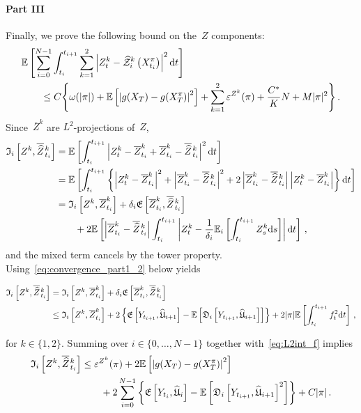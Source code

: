 \paragraph{\textbf{Part III}} 
Finally, we prove the following bound on the~$Z$ components:
\begin{align}\label{eq:convergence_part3_result}
\begin{split}
 &\mathbb{E}\left[\sum_{i=0}^{N-1} \int_{t_i}^{t_{i+1}}\sum_{k=1}^2\left|Z_t^k-\widehat{\mathcal{Z}}^k_i\left(X^\pi_{t_i}\right)\right|^2 \mathrm{d} t\right] \\
 &\qquad\leq C\Bigg\{\omega(|\pi|) + \mathbb{E}\left[\left|g(X_T)-g(X^\pi_T)\right|^2\right]+\sum_{k=1}^2\varepsilon^{Z^k}(\pi)+\frac{C^{*}}{K}N + M|\pi|^2\Bigg\}\,.
 \end{split}
\end{align}
Since~$\overline{Z}^k$ are $L^2$-projections of~$Z$,
\begin{align*}
\mathfrak{I}_i\left[Z^k, \overline{\widehat{Z}}\kern0.1em^{k}_{t_i}\right] 
&= \mathbb{E}\left[\int_{t_i}^{t_{i+1}}\left|Z^k_t - \overline{Z}^{k}_{t_{i}} + \overline{Z}^{k}_{t_{i}} - \overline{\widehat{Z}}\kern0.1em^{k}_{t_{i}}\right|^2\mathrm{d} t\right] \\
 &= \mathbb{E}\left[ \int_{t_i}^{t_{i+1}}\left\{
 \left|Z^k_t - \overline{Z}^{k}_{t_{i}}\right|^2 + \left|\overline{Z}^{k}_{t_{i}} - \overline{\widehat{Z}}\kern0.1em^{k}_{t_{i}}\right|^2 +
 2
 \left|\overline{Z}^{k}_{t_{i}} - \overline{\widehat{Z}}\kern0.1em^{k}_{t_{i}}\right|
 \left|Z^k_t - \overline{Z}^{k}_{t_{i}}\right|
 \right\}\mathrm{d} t \right]\\
 &= \mathfrak{I}_i\left[Z^k, \overline{Z}^{k}_{t_i}\right] + \delta_{i} \mathfrak{E}\left[\overline{Z}^k_{t_i}, \overline{\widehat{Z}}\kern0.1em^{k}_{t_i}\right] \\
 &\qquad + 2\mathbb{E}\left[\left|\overline{Z}^{k}_{t_{i}} - \overline{\widehat{Z}}\kern0.1em^{k}_{t_{i}}\right| \int_{t_i}^{t_{i+1}}\left|Z^k_t - \frac{1}{\delta_{i}} \mathbb{E}_{i}\left[\int_{t_{i}}^{t_{i+1}} Z^k_{s} \mathrm{d} s\right]\right| \mathrm{d} t \right]\,,
\end{align*}
and the mixed term cancels by the tower property. 
Using~\eqref{eq:convergence_part1_2} below yields
\begin{small}
\begin{align*}
\mathfrak{I}_i\left[Z^k, \overline{\widehat{Z}}\kern0.1em^{k}_{t_i}\right]
& =\mathfrak{I}_i\left[Z^k, \overline{Z}^{k}_{t_i}\right] + \delta_{i} \mathfrak{E}\left[\overline{Z}^k_{t_i}, \overline{\widehat{Z}}\kern0.1em^{k}_{t_i}\right] \\
&\leq \mathfrak{I}_i\left[Z^k, \overline{Z}^{k}_{t_i}\right] +  2 \left\{\mathfrak{E}\left[Y_{t_{i+1}}, \widehat{\mathfrak{U}}_{i+1}\right]
 - \mathbb{E}\left[\mathfrak{D}_i\left[Y_{t_{i+1}}, \widehat{\mathfrak{U}}_{i+1}\right]\right]\right\}
 + 2 |\pi| \mathbb{E}\left[\int_{t_i}^{t_{i+1}}f_{t}^2 \mathrm{d} t\right]\,,
\end{align*}
\end{small}%
for $k\in\{1,2\}$. 
Summing over $i\in\{0,\dots,N-1\}$ together with~\eqref{eq:L2int_f} implies
\begin{equation}\label{eq:convergence_part3_0}
\begin{aligned}
\mathfrak{I}_i\left[Z^k, \overline{\widehat{Z}}\kern0.1em^{k}_{t_i}\right] &\leq \varepsilon^{Z^k}(\pi) + 2\mathbb{E}\left[\left|g(X_T)-g(X^\pi_T)\right|^2\right] \\
& \qquad + 2\sum_{i=0}^{N-1}\left\{\mathfrak{E}\left[Y_{t_i}, \widehat{\mathfrak{U}}_{i}\right] - \mathbb{E}\left[\mathfrak{D}_i\left[Y_{t_{i+1}}, \widehat{\mathfrak{U}}_{i+1}\right]^{2}\right]\right\} + C|\pi|\,.
\end{aligned}
\end{equation}
